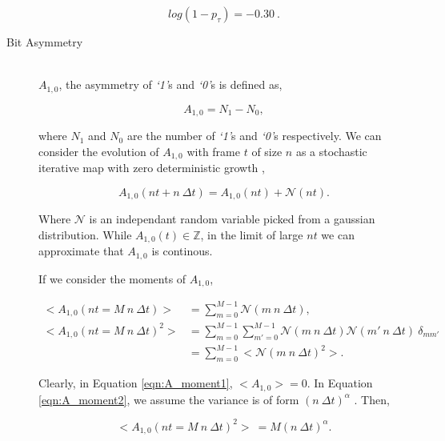 \begin{description}
			\begin{equation}
				log(1 - p_\tau) = -0.30\ .
				\label{eqn:log_chain_length_gradient}			
			\end{equation}

		\item[Bit Asymmetry] \hfill \\
			
			$A_{1,0}$, the asymmetry of \textit{`1'}s and \textit{`0'}s is defined as,

			\begin{equation}
				A_{1,0} = N_1 - N_0,
				\label{eqn:a_def}
			\end{equation}

			where $N_1$ and $N_0$ are the number of \textit{`1'}s and \textit{`0'}s respectively.
			We can consider the evolution of $A_{1,0}$ with frame $t$ of size $n$ as a stochastic iterative map with zero deterministic growth \cite{ref:stockastic_physics},

			\begin{equation}
				A_{1,0}(nt + n\ \Delta t) = A_{1,0}(nt) + \mathcal{N}(nt).
			\end{equation}

			Where $\mathcal{N}$ is an independant random variable picked from a gaussian distribution. While $A_{1,0}(t) \in \mathbb{Z}$, in the limit of large $nt$ we can approximate that $A_{1,0}$ is continous. 
			\par
			If we consider the moments of $A_{1,0}$,

			\begin{align}
				\label{eqn:A_moment1}
				<A_{1,0}(nt = M\ n\ \Delta t)> & = \sum_{m = 0}^{M -1}  \mathcal{N}(m\ n\ \Delta t), \\
				\label{eqn:A_moment2}
				<A_{1,0}(nt = M\ n\ \Delta t)^2> & = \sum_{m=0}^{M-1} \sum_{m'=0}^{M-1}  \mathcal{N}(m\ n\ \Delta t) \mathcal{N}(m'\ n\ \Delta t)\ \delta_{mm'} \nonumber \\
				&= \sum_{m=0}^{M-1} < \mathcal{N}(m\ n\ \Delta t)^2 >.
			\end{align}

			Clearly, in Equation \ref{eqn:A_moment1}, $<A_{1,0}> = 0$. In Equation \ref{eqn:A_moment2}, we assume the variance is of form $(n\ \Delta t)^\alpha$ \cite{ref:stockastic_physics}. Then,

			\begin{equation}
				<A_{1,0}(nt = M\ n\ \Delta t)^2>\ = M (n\ \Delta t)^\alpha.
				\label{eqn:A_moment3}
			\end{equation}


\end{description}
